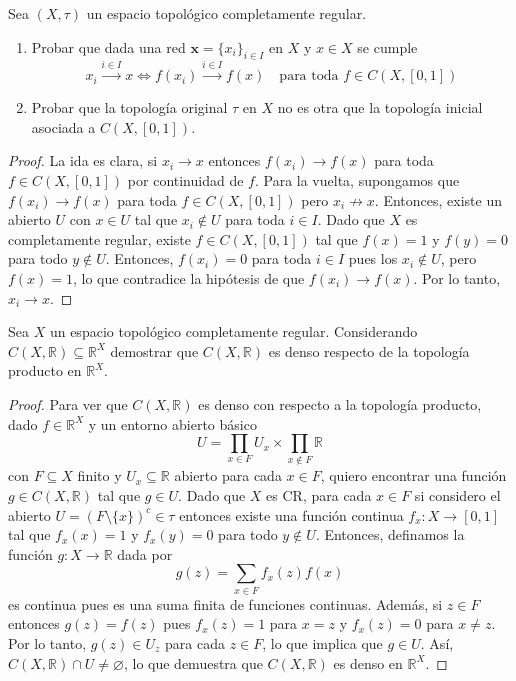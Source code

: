 \documentclass{article}
\theoremstyle{plain}
\theoremstyle{definition}
\newcommand{\R}{\mathbb{R}}
\newenvironment{ejercicio}[1]{\begin{trivlist}
\item[\hskip \labelsep {\bfseries Ejercicio}\hskip \labelsep {\bfseries #1.}]}{\end{trivlist}}
\begin{document}
\begin{ejercicio}{2}
    Sea \( (X, \tau) \) un espacio topológico completamente regular.
    \begin{enumerate}
        \item Probar que dada una red \( \mathbf{x} = {\{x_i\}}_{i \in I} \) en \( X \) y \( x \in X \) se cumple
              \[
                  x_i \xrightarrow{i \in I} x \iff f(x_i) \xrightarrow{i \in I} f(x) \quad \text{para toda } f \in C(X, [0,1])
              \]
        \item Probar que la topología original \( \tau \) en \( X \) no es otra que la topología inicial asociada a \( C(X, [0,1]) \).
    \end{enumerate}
\end{ejercicio}
\begin{proof}
    La ida es clara, si \( x_i \to x \) entonces \( f(x_i) \to f(x) \) para toda \( f \in C(X, [0,1]) \) por continuidad de \( f \). Para la vuelta, supongamos que \( f(x_i) \to f(x) \) para toda \( f \in C(X, [0,1]) \) pero \( x_i \not\to x \). Entonces, existe un abierto \( U \) con \( x \in U \) tal que \( x_i \notin U \) para toda \( i \in I \). Dado que \( X \) es completamente regular, existe \( f \in C(X, [0, 1]) \) tal que \( f(x) = 1 \) y \( f(y) = 0 \) para todo \( y \notin U \). Entonces, \( f(x_i) = 0 \) para toda \( i \in I \) pues los \( x_i \notin U \), pero \( f(x) = 1 \), lo que contradice la hipótesis de que \( f(x_i) \to f(x) \). Por lo tanto, \( x_i \to x \).
\end{proof}

\begin{ejercicio}{3}
    Sea \( X \) un espacio topológico completamente regular. Considerando \( C(X, \R) \subseteq \R^X \) demostrar que \( C(X, \R) \) es denso respecto de la topología producto en \( \R^X \).
\end{ejercicio}
\begin{proof}
    Para ver que \( C(X, \R) \) es denso con respecto a la topología producto, dado \( f \in \R^X \) y un entorno abierto básico \[ U = \prod_{x \in F} U_x \times \prod_{x \notin F} \R \] con \( F \subseteq X \) finito y
    \( U_x \subseteq \R \) abierto para cada \( x \in F \), quiero encontrar una función \( g \in C(X, \R) \) tal que \( g \in U \). Dado que \( X \) es CR, para cada \( x \in F \) si considero el abierto \( U = {(F \setminus \{ x \})}^c \in \tau \)
    entonces existe una función continua \( f_x : X \to [0, 1] \) tal que \( f_x(x) = 1 \) y \( f_x(y) = 0 \) para todo \( y \notin U \). Entonces, definamos la función \( g : X \to \R \) dada por
    \[
        g(z) = \sum_{x \in F} f_x(z) f(x)
    \]
    es continua pues es una suma finita de funciones continuas. Además, si \( z \in F \) entonces \( g(z) = f(z) \) pues \( f_x(z) = 1 \) para \( x = z \) y \( f_x(z) = 0 \) para \( x \neq z \). Por lo tanto, \( g(z) \in U_z \) para cada \( z \in F \), lo que implica que \( g \in U \). Así, \( C(X, \R) \cap U \neq \varnothing \), lo que demuestra que \( C(X, \R) \) es denso en \( \R^X \).
\end{proof}
\end{document}
